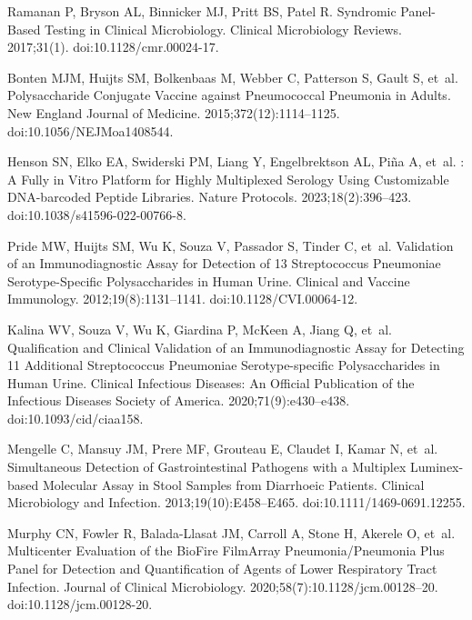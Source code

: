 \documentclass[10pt,letterpaper]{article}
\begin{document}
\nolinenumbers

% 
\begin{thebibliography}{10}

Ramanan P, Bryson AL, Binnicker MJ, Pritt BS, Patel R.
\newblock Syndromic {{Panel-Based Testing}} in {{Clinical Microbiology}}.
\newblock Clinical Microbiology Reviews. 2017;31(1).
\newblock doi:{10.1128/cmr.00024-17}.

Bonten MJM, Huijts SM, Bolkenbaas M, Webber C, Patterson S, Gault S, et~al.
\newblock Polysaccharide {{Conjugate Vaccine}} against {{Pneumococcal
  Pneumonia}} in {{Adults}}.
\newblock New England Journal of Medicine. 2015;372(12):1114--1125.
\newblock doi:{10.1056/NEJMoa1408544}.

Henson SN, Elko EA, Swiderski PM, Liang Y, Engelbrektson AL, Piña A, et~al.
: A Fully in Vitro Platform for Highly Multiplexed Serology
  Using Customizable {{DNA-barcoded}} Peptide Libraries.
\newblock Nature Protocols. 2023;18(2):396--423.
\newblock doi:{10.1038/s41596-022-00766-8}.

Pride MW, Huijts SM, Wu K, Souza V, Passador S, Tinder C, et~al.
\newblock Validation of an {{Immunodiagnostic Assay}} for {{Detection}} of 13
  {{Streptococcus}} Pneumoniae {{Serotype-Specific Polysaccharides}} in {{Human
  Urine}}.
\newblock Clinical and Vaccine Immunology. 2012;19(8):1131--1141.
\newblock doi:{10.1128/CVI.00064-12}.

Kalina WV, Souza V, Wu K, Giardina P, McKeen A, Jiang Q, et~al.
\newblock Qualification and {{Clinical Validation}} of an {{Immunodiagnostic
  Assay}} for {{Detecting}} 11 {{Additional Streptococcus}} Pneumoniae
  {{Serotype-specific Polysaccharides}} in {{Human Urine}}.
\newblock Clinical Infectious Diseases: An Official Publication of the
  Infectious Diseases Society of America. 2020;71(9):e430--e438.
\newblock doi:{10.1093/cid/ciaa158}.

Mengelle C, Mansuy JM, Prere MF, Grouteau E, Claudet I, Kamar N, et~al.
\newblock Simultaneous Detection of Gastrointestinal Pathogens with a Multiplex
  {{Luminex-based}} Molecular Assay in Stool Samples from Diarrhoeic Patients.
\newblock Clinical Microbiology and Infection. 2013;19(10):E458--E465.
\newblock doi:{10.1111/1469-0691.12255}.

Murphy CN, Fowler R, {Balada-Llasat} JM, Carroll A, Stone H, Akerele O, et~al.
\newblock Multicenter {{Evaluation}} of the {{BioFire FilmArray
  Pneumonia}}/{{Pneumonia Plus Panel}} for {{Detection}} and {{Quantification}}
  of {{Agents}} of {{Lower Respiratory Tract Infection}}.
\newblock Journal of Clinical Microbiology. 2020;58(7):10.1128/jcm.00128--20.
\newblock doi:{10.1128/jcm.00128-20}.


\end{thebibliography}
\end{document}

